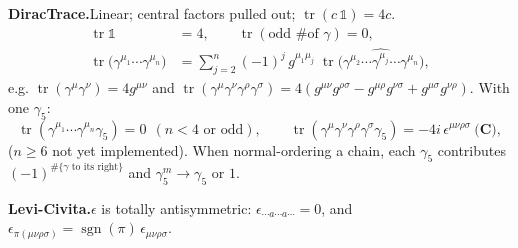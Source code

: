 \documentclass[11pt]{article}
\newcommand{\g}{g}
\newcommand{\tr}{\operatorname{tr}}
\newcommand{\gm}[1]{\gamma^{#1}}
\newcommand{\gfive}{\gamma_5}
\begin{document}
\textbf{DiracTrace.}\quad Linear; central factors pulled out; $\tr(c\,\mathbb{1})=4c$.
\begin{align}
\tr\mathbb{1} &= 4, \qquad \tr(\text{odd \# of }\gamma)=0,\\
\tr\!\big(\gm{\mu_1}\cdots\gm{\mu_n}\big) &= \sum_{j=2}^{n} (-1)^{j}\,\g^{\mu_1\mu_j}\;
   \tr\!\big(\gm{\mu_2}\cdots\widehat{\gm{\mu_j}}\cdots\gm{\mu_n}\big),
\end{align}
e.g. $\tr(\gm\mu\gm\nu)=4\g^{\mu\nu}$ and
$\tr(\gm\mu\gm\nu\gm\rho\gm\sigma)=4(\g^{\mu\nu}\g^{\rho\sigma}-\g^{\mu\rho}\g^{\nu\sigma}+\g^{\mu\sigma}\g^{\nu\rho})$.
With one $\gfive$:
\begin{equation}
\tr(\gm{\mu_1}\cdots\gm{\mu_n}\gfive)=0\ \ (n<4\text{ or odd}),\qquad
\tr(\gm\mu\gm\nu\gm\rho\gm\sigma\gfive)=-4i\,\epsilon^{\mu\nu\rho\sigma}\ \textbf{(C)},
\end{equation}
($n\geq6$ not yet implemented). When normal-ordering a chain, each $\gfive$
contributes $(-1)^{\#\{\gamma\text{ to its right}\}}$ and $\gfive^{m}\to\gfive$ or $1$.

\textbf{Levi-Civita.}\quad $\epsilon$ is totally antisymmetric:
$\epsilon_{\cdots a \cdots a \cdots}=0$, and
$\epsilon_{\pi(\mu\nu\rho\sigma)}=\operatorname{sgn}(\pi)\,\epsilon_{\mu\nu\rho\sigma}$.
\end{document}
